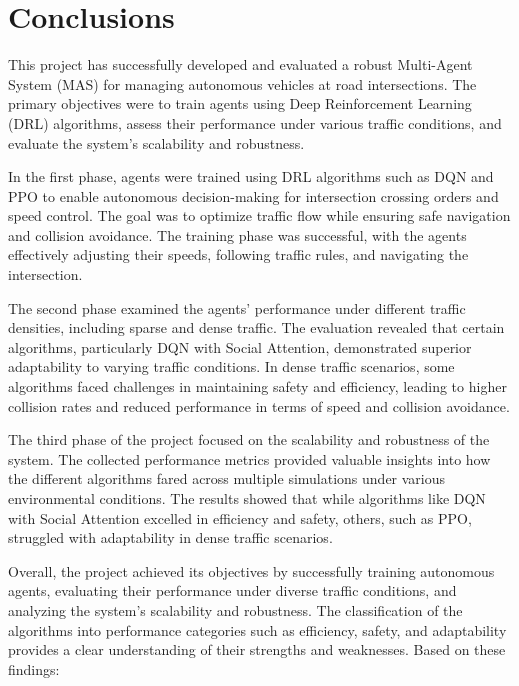 \section{Conclusions}

This project has successfully developed and evaluated a robust Multi-Agent System (MAS) for managing autonomous vehicles at road intersections. The primary objectives were to train agents using Deep Reinforcement Learning (DRL) algorithms, assess their performance under various traffic conditions, and evaluate the system's scalability and robustness.

In the first phase, agents were trained using DRL algorithms such as DQN and PPO to enable autonomous decision-making for intersection crossing orders and speed control. The goal was to optimize traffic flow while ensuring safe navigation and collision avoidance. The training phase was successful, with the agents effectively adjusting their speeds, following traffic rules, and navigating the intersection.

The second phase examined the agents' performance under different traffic densities, including sparse and dense traffic. The evaluation revealed that certain algorithms, particularly DQN with Social Attention, demonstrated superior adaptability to varying traffic conditions. In dense traffic scenarios, some algorithms faced challenges in maintaining safety and efficiency, leading to higher collision rates and reduced performance in terms of speed and collision avoidance.

The third phase of the project focused on the scalability and robustness of the system. The collected performance metrics provided valuable insights into how the different algorithms fared across multiple simulations under various environmental conditions. The results showed that while algorithms like DQN with Social Attention excelled in efficiency and safety, others, such as PPO, struggled with adaptability in dense traffic scenarios.

Overall, the project achieved its objectives by successfully training autonomous agents, evaluating their performance under diverse traffic conditions, and analyzing the system's scalability and robustness. The classification of the algorithms into performance categories such as efficiency, safety, and adaptability provides a clear understanding of their strengths and weaknesses. Based on these findings:

